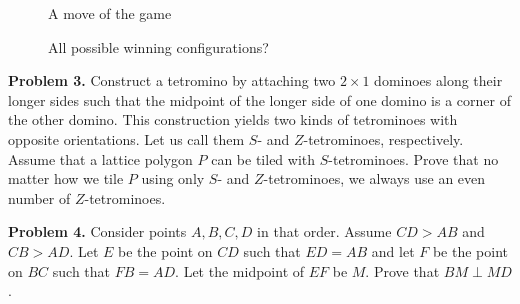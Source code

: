 \documentclass[10pt,a4paper,notitlepage]{article}
\begin{document}
\begin{figure}[h]
\centering
{}
\caption{A move of the game}
\label{fig:fig2}
\end{figure}

\begin{figure}[h]
\centering
{}
\caption{All possible winning configurations?}
\label{fig:fig3}
\end{figure}

\textbf{Problem 3.}
Construct a tetromino by attaching two $2 \times 1$ dominoes along their longer sides such that the midpoint of the longer side of one domino is a corner of the other domino. This construction yields two kinds of tetrominoes with opposite orientations. Let us call them $S$- and $Z$-tetrominoes, respectively.
Assume that a lattice polygon $P$ can be tiled with $S$-tetrominoes. Prove that no matter how we tile $P$ using only $S$- and $Z$-tetrominoes, we always use an even number of $Z$-tetrominoes.

\textbf{Problem 4.}
Consider points $A, B, C, D$ in that order. Assume $CD > AB$ and $CB > AD$. Let $E$ be the point on $CD$ such that $ED = AB$ and let $F$ be the point on $BC$ such that $FB = AD$. Let the midpoint of $EF$ be $M$. Prove that $BM \perp MD$.
\end{document}

